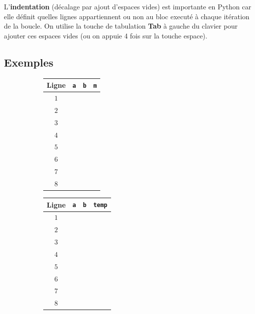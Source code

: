 L'\textbf{indentation} (décalage par ajout d'espaces vides) est importante en Python car elle définit quelles lignes appartiennent ou non au bloc executé à chaque itération de la boucle.
On utilise la touche de tabulation \textbf{Tab} à gauche du clavier pour ajouter ces espaces vides (ou on appuie 4 fois sur la touche espace).

\newpage

\subsection*{Exemples}

\def\arraystretch{1}
\setlength\tabcolsep{5pt}
\begin{figure}[h]
\begin{subfigure}{.22\textwidth}
	\begin{tabular}{|c|c|c|c|}\hline
		Ligne & \texttt{a} & \texttt{b} & \texttt{m} \\ \hline
		$1$ &&& \\ \hline
		$2$ &&& \\ \hline
		$3$ &&& \\ \hline
		$4$ &&& \\ \hline
		$5$ &&& \\ \hline
		$6$ &&& \\ \hline
		$7$ &&& \\ \hline
		$8$ &&& \\ \hline
	\end{tabular}
\end{subfigure}
\begin{subfigure}{.24\textwidth}
\vspace{14pt}
\end{subfigure}
\hspace{10pt}
\begin{subfigure}{.26\textwidth}
	\begin{tabular}{|c|c|c|c|}\hline
		Ligne & \texttt{a} & \texttt{b} & \texttt{temp} \\ \hline
		$1$ &&& \\ \hline
		$2$ &&& \\ \hline
		$3$ &&& \\ \hline
		$4$ &&& \\ \hline
		$5$ &&& \\ \hline
		$6$ &&& \\ \hline
		$7$ &&& \\ \hline
		$8$ &&& \\ \hline
	\end{tabular}
\end{subfigure}
\begin{subfigure}{.24\textwidth}
\vspace{15pt}
\end{subfigure}


\end{figure}
